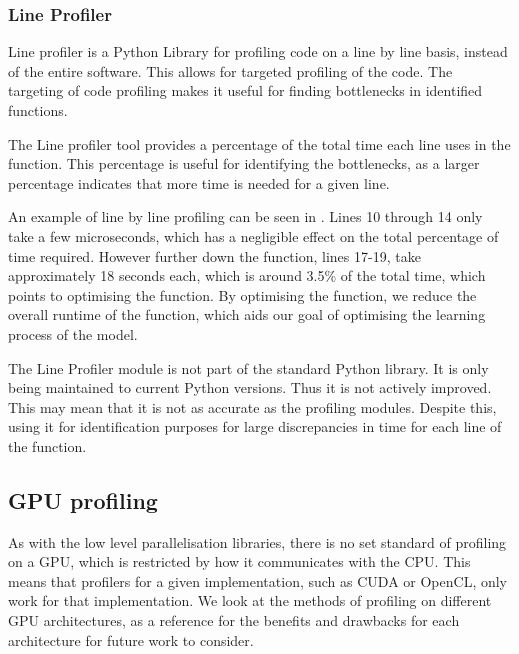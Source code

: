 \subsubsection{Line Profiler}
Line profiler is a Python Library for profiling code on a line by line basis, instead of the entire software.
This allows for targeted profiling of the code.
The targeting of code profiling makes it useful for finding bottlenecks in identified functions.


The Line profiler tool provides a percentage of the total time each line uses in the function.
This percentage is useful for identifying the bottlenecks, as a larger percentage indicates that more time is needed for a given line. 

An example of line by line profiling can be seen in .
Lines 10 through 14 only take a few microseconds, which has a negligible effect on the total percentage of time required.
However further down the function, lines 17-19, take approximately 18 seconds each, which is around 3.5\% of the total time, which points to optimising the  function.
By optimising the  function, we reduce the overall runtime of the  function, which aids our goal of optimising the learning process of the model.


The Line Profiler module is not part of the standard Python library.
It is only being maintained to current Python versions.
Thus it is not actively improved.
This may mean that it is not as accurate as the profiling modules.
Despite this, using it for identification purposes for large discrepancies in time for each line of the function.







\subsection{GPU profiling}

As with the low level parallelisation libraries, there is no set standard of profiling on a GPU, which is restricted by how it communicates with the CPU. 
This means that profilers for a given implementation, such as CUDA or OpenCL, only work for that implementation.
We look at the methods of profiling on different GPU architectures, as a reference for the benefits and drawbacks for each architecture for future work to consider.

